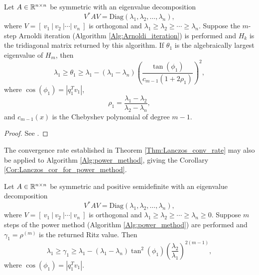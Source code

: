 \begin{theorem}   		\label{Thm:Lanczos_conv_rate}
Let $A \in {\mathbb R}^{n \times n}$ be symmetric with an eigenvalue decomposition
\[
V^*AV = \text{Diag}(\lambda_1, \lambda_2, \ldots, \lambda_n),
\]
where $V = [\ v_1 \ | \ v_2 \ | \cdots | \ v_n \ ]$ is orthogonal and $\lambda_1 \geq \lambda_2 \geq \cdots \geq \lambda_n$.  Suppose the $m$-step Arnoldi iteration (Algorithm \ref{Alg:Arnoldi_iteration}) is performed and $H_k$ is the tridiagonal matrix returned by this algorithm.  If $\theta_1$ is the algebraically largest eigenvalue of $H_m$, then
\begin{equation} 			\label{Eqn:Lanczos_thm_1}
\lambda_1 \geq \theta_1 \geq \lambda_1 - (\lambda_1 - \lambda_n) 
\left( \frac{\tan(\phi_1)}{c_{m-1}(1+2\rho_1)} \right)^2,
\end{equation}
where $\cos(\phi_1) = |q_1^Tv_1|$,
\begin{equation}		\label{Eqn:Lanczos_thm_2}
\rho_1 = \frac{\lambda_1 - \lambda_2}{\lambda_2 - \lambda_n},
\end{equation}
and $c_{m-1}(x)$ is the Chebyshev polynomial of degree $m-1$.
\end{theorem}

\begin{proof}
See \cite[Theorem 10.1.2]{golub2012matrix}.
\end{proof}

The convergence rate established in Theorem \ref{Thm:Lanczos_conv_rate} may also be applied to Algorithm \ref{Alg:power_method}, giving the Corollary \ref{Cor:Lanczos_cor_for_power_method}.

\begin{corollary} 			\label{Cor:Lanczos_cor_for_power_method}
Let $A \in {\mathbb R}^{n \times n}$ be symmetric and positive semidefinite with an eigenvalue decomposition
\[
V^*AV = \text{Diag}(\lambda_1, \lambda_2, \ldots, \lambda_n),
\]
where $V = [\ v_1 \ | \ v_2 \ | \cdots | \ v_n \ ]$ is orthogonal and $\lambda_1 \geq \lambda_2 \geq \cdots \geq \lambda_n \geq 0$.  Suppose $m$ steps of the power method (Algorithm \ref{Alg:power_method}) are performed and $\gamma_1 = \rho^{(m)}$ is the returned Ritz value.  Then
\begin{equation} 			\label{Eqn:Lanczos_cor_for_power_method}
\lambda_1 \geq \gamma_1 \geq \lambda_1 - (\lambda_1 - \lambda_n) 
\tan^2(\phi_1) \left( \frac{\lambda_2}{\lambda_1} \right)^{2(m-1)},
\end{equation}
where $\cos(\phi_1) = |q_1^Tv_1|$.
\end{corollary}

